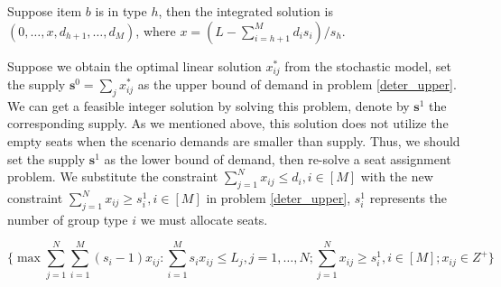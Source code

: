\begin{lem}
Suppose item $b$ is in type $h$, then the integrated solution is $(0,\ldots, x,d_{h+1}, \ldots, d_{M})$, where $x = (L- \sum_{i = h+1}^{M} {d_i s_i})/ s_h$.  
\end{lem}


  


Suppose we obtain the optimal linear solution $x^{*}_{ij}$ from the stochastic model, set the supply $\mathbf{s}^{0} = \sum_{j} x^{*}_{ij}$ as the upper bound of demand in problem \eqref{deter_upper}. We can get a feasible integer solution by solving this problem, denote by $\mathbf{s}^{1}$ the corresponding supply. As we mentioned above, this solution does not utilize the empty seats when the scenario demands are smaller than supply. Thus, we should set the supply $\mathbf{s}^{1}$ as the lower bound of demand, then re-solve a seat assignment problem. We substitute the constraint $\sum_{j =1}^{N} x_{ij} \leq d_{i}, i \in [M]$ with the new constraint $\sum_{j =1}^{N} x_{ij} \geq s_{i}^{1}, i \in [M]$ in problem \eqref{deter_upper}, $s_{i}^{1}$ represents the number of group type $i$ we must allocate seats.

\begin{equation}\label{deter_lower}
\{\max \sum_{j=1}^{N} \sum_{i=1}^{M}(s_i -1)x_{ij}: \sum_{i = 1}^{M} s_i x_{ij} \leq L_{j}, j=1,\ldots,N; \sum_{j =1}^{N} x_{ij} \geq s_{i}^{1}, i \in [M]; x_{ij} \in Z^{+} \}
\end{equation}


